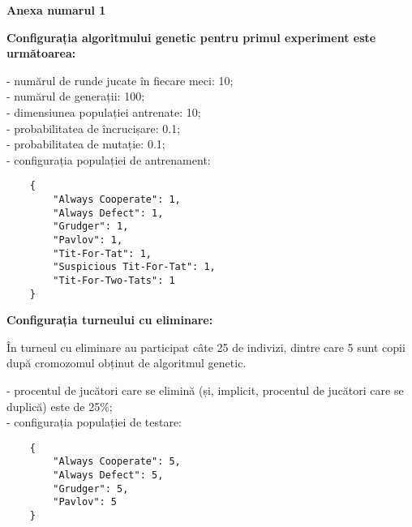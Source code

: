 \begin{center}
	\textbf{Anexa numarul 1}
\end{center}

\textbf{Configurația algoritmului genetic pentru primul experiment este următoarea: }

- numărul de runde jucate în fiecare meci: 10;\\
- numărul de generații: 100;\\
- dimensiunea populației antrenate: 10;\\
- probabilitatea de încrucișare: 0.1;\\
- probabilitatea de mutație: 0.1;\\
- configurația populației de antrenament:\\
\begin{center}
	\begin{lstlisting}
	{
		"Always Cooperate": 1,
		"Always Defect": 1,
		"Grudger": 1,
		"Pavlov": 1,
		"Tit-For-Tat": 1,
		"Suspicious Tit-For-Tat": 1,
		"Tit-For-Two-Tats": 1
	}
\end{lstlisting}
\end{center}
 
\textbf{Configurația turneului cu eliminare: }

În turneul cu eliminare au participat câte 25 de indivizi, dintre care 5 sunt copii după cromozomul obținut de algoritmul genetic. 

- procentul de jucători care se elimină (și, implicit, procentul de jucători care se duplică) este de 25\%;\\
- configurația populației de testare:\\
\begin{center}
	\begin{lstlisting}
	{
		"Always Cooperate": 5,
		"Always Defect": 5,
		"Grudger": 5,
		"Pavlov": 5
	}
	\end{lstlisting}
\end{center}

\clearpage